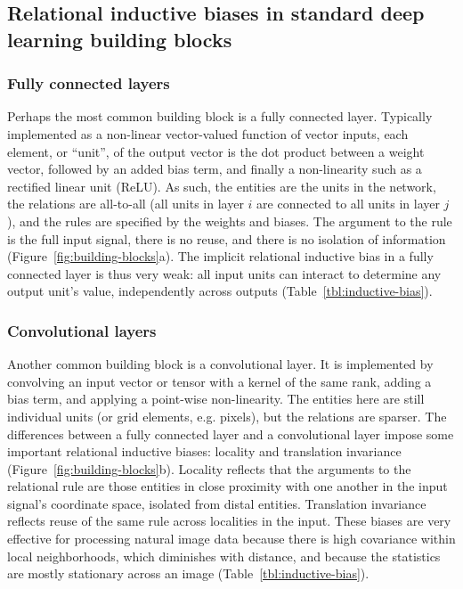 \documentclass[10pt]{book}
\begin{document}
\subsection{Relational inductive biases in standard deep learning building blocks}

\subsubsection{Fully connected layers}

Perhaps the most common building block is a fully connected layer. Typically implemented as a non-linear vector-valued function of vector inputs, each element, or ``unit'', of the output vector is the dot product between a weight vector, followed by an added bias term, and finally a non-linearity such as a rectified linear unit (ReLU). As such, the entities are the units in the network, the relations are all-to-all (all units in layer $i$ are connected to all units in layer $j$), and the rules are specified by the weights and biases. The argument to the rule is the full input signal, there is no reuse, and there is no isolation of information (Figure~\ref{fig:building-blocks}a). The implicit relational inductive bias in a fully connected layer is thus very weak: all input units can interact to determine any output unit's value, independently across outputs (Table~\ref{tbl:inductive-bias}).

\subsubsection{Convolutional layers}

Another common building block is a convolutional layer.
It is implemented by convolving an input vector or tensor with a kernel of the same rank, adding a bias term, and applying a point-wise non-linearity.
The entities here are still individual units (or grid elements, e.g. pixels), but the relations are sparser. 
The differences between a fully connected layer and a convolutional layer impose some important relational inductive biases: locality and translation invariance (Figure~\ref{fig:building-blocks}b).
Locality reflects that the arguments to the relational rule are those entities in close proximity with one another in the input signal's coordinate space, isolated from distal entities.
Translation invariance reflects reuse of the same rule across localities in the input.
These biases are very effective for processing natural image data because there is high covariance within local neighborhoods, which diminishes with distance, and because the statistics are mostly stationary across an image (Table~\ref{tbl:inductive-bias}).
\end{document}
